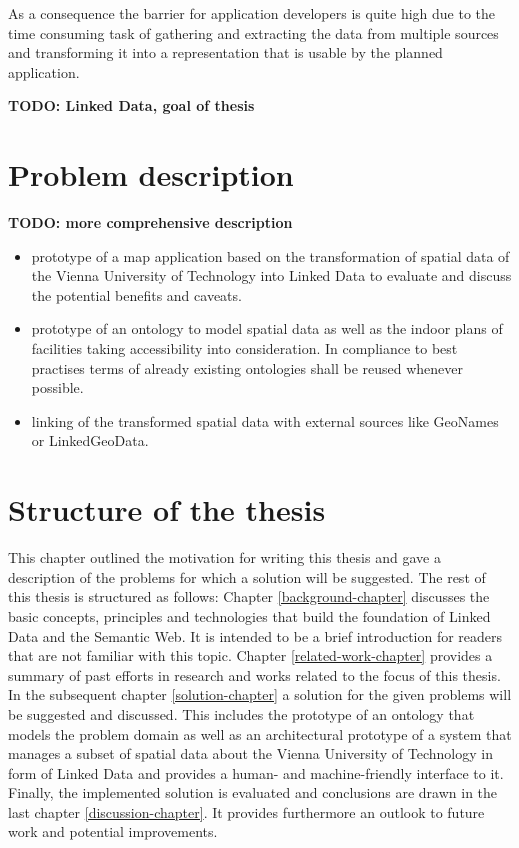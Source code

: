 \documentclass[draft,final]{vutinfth} %
\newcommand{\todo}[1]{{\color{red}\textbf{TODO: {#1}}}} %
\begin{document}
As a consequence the barrier for application developers is quite high due to the time consuming task of gathering and extracting the data from multiple sources and transforming it into a representation that is usable by the planned application.

\todo{Linked Data, goal of thesis}

\section{Problem description}
\label{intro-problem-description}

\todo{more comprehensive description}

\begin{itemize}
	\item prototype of a map application based on the transformation of spatial data of the Vienna University of Technology into Linked Data to evaluate and discuss the potential benefits and caveats. 
	\item prototype of an ontology to model spatial data as well as the indoor plans of facilities taking accessibility into consideration. In compliance to best practises terms of already existing ontologies shall be reused whenever possible.
	\item linking of the transformed spatial data with external sources like GeoNames or LinkedGeoData. 
\end{itemize}

\section{Structure of the thesis}
This chapter outlined the motivation for writing this thesis and gave a description of the problems for which a solution will be suggested. The rest of this thesis is structured as follows: Chapter \ref{background-chapter} discusses the basic concepts, principles and technologies that build the foundation of Linked Data and the Semantic Web. It is intended to be a brief introduction for readers that are not familiar with this topic. Chapter \ref{related-work-chapter} provides a summary of past efforts in research and works related to the focus of this thesis. In the subsequent chapter \ref{solution-chapter} a solution for the given problems will be suggested and discussed. This includes the prototype of an ontology that models the problem domain as well as an architectural prototype of a system that manages a subset of spatial data about the Vienna University of Technology in form of Linked Data and provides a human- and machine-friendly interface to it. Finally, the implemented solution is evaluated and conclusions are drawn in the last chapter \ref{discussion-chapter}. It provides furthermore an outlook to future work and potential improvements. 
\end{document}
